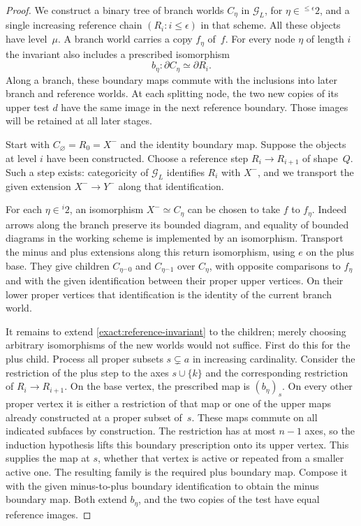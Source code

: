 \begin{proof}
We construct a binary tree of branch worlds $C_\eta$ in
$\mathcal G_L$, for $\eta\in{}^{\le\epsilon}2$, and a single
increasing reference chain $(R_i:i\le\epsilon)$ in that scheme.
All these objects have level~$\mu$.  A branch world carries a copy
$f_\eta$ of~$f$.  For every node $\eta$ of length $i$ the invariant
also includes a prescribed isomorphism
\begin{equation}
 b_\eta:\partial C_\eta\simeq\partial R_i.
 \label{exact:reference-invariant}
\end{equation}
Along a branch, these boundary maps commute with the inclusions into
later branch and reference worlds.  At each splitting node, the two
new copies of its upper test $d$ have the same image in the next
reference boundary.  Those images will be retained at all later
stages.

Start with $C_\varnothing=R_0=X^-$ and the identity boundary map.
Suppose the objects at level $i$ have been constructed.  Choose a
reference step $R_i\to R_{i+1}$ of shape~$Q$.  Such a step exists:
categoricity of $\mathcal G_L$ identifies $R_i$ with $X^-$, and we
transport the given extension $X^-\to Y^-$ along that
identification.

For each $\eta\in{}^i2$, an isomorphism $X^-\simeq C_\eta$ can
be chosen to take $f$ to $f_\eta$.  Indeed arrows along the branch
preserve its bounded diagram, and equality of bounded diagrams in
the working scheme is implemented by an isomorphism.  Transport
the minus and plus extensions along this return isomorphism, using
$e$ on the plus base.  They give children $C_{\eta^\frown 0}$ and
$C_{\eta^\frown 1}$ over $C_\eta$, with opposite comparisons to
$f_\eta$ and with the given identification between their proper
upper vertices.  On their lower proper vertices that identification
is the identity of the current branch world.

It remains to extend \eqref{exact:reference-invariant} to the
children; merely choosing arbitrary isomorphisms of the new worlds
would not suffice.  First do this for the plus child.  Process all
proper subsets $s\subsetneq a$ in increasing cardinality.  Consider
the restriction of the plus step to the axes $s\cup\{k\}$ and the
corresponding restriction of $R_i\to R_{i+1}$.  On the base
vertex, the prescribed map is $(b_\eta)_s$.  On every other proper
vertex it is either a restriction of that map or one of the upper
maps already constructed at a proper subset of~$s$.  These maps
commute on all indicated subfaces by construction.  The restriction
has at most $n-1$ axes, so the induction hypothesis lifts this
boundary prescription onto its upper vertex.  This supplies the
map at $s$, whether that vertex is active or repeated from a
smaller active one.  The resulting family is the required plus
boundary map.  Compose it with the given minus-to-plus boundary
identification to obtain the minus boundary map.  Both extend
$b_\eta$, and the two copies of the test have equal reference
images.


\end{proof}
